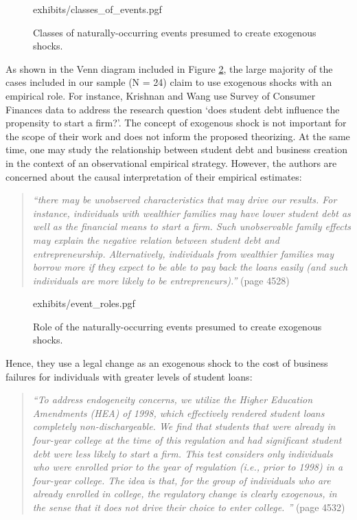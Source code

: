 \begin{refsection}
\begin{figure}[!htbp]
    \centering
    {exhibits/classes_of_events.pgf}
    \caption{Classes of naturally-occurring events presumed to create 
    exogenous shocks.}
    \label{fig:classes_of_events}
\end{figure}

As shown in the Venn diagram included in Figure \ref{fig:event_roles}, the large
majority of the cases included in our sample (N = 24) claim to use exogenous
shocks with an empirical role. For instance, Krishnan and Wang
\autocite*{krishnan20194522} use Survey of Consumer Finances data to address the
research question `does student debt influence the propensity to start a firm?'.
The concept of exogenous shock is not important for the scope of their work and
does not inform the proposed theorizing. At the same time, one may study the
relationship between student debt and business creation in the context of an
observational empirical strategy. However, the authors are concerned about the
causal interpretation of their empirical estimates:

\begin{quote}
  \textit{
  ``there may be unobserved characteristics that may drive our results. For
  instance, individuals with wealthier families may have lower student debt as
  well as the financial means to start a firm. Such unobservable family effects
  may explain the negative relation between student debt and entrepreneurship.
  Alternatively, individuals from wealthier families may borrow more if they
  expect to be able to pay back the loans easily (and such individuals are more
  likely to be entrepreneurs).''
  }
  (page 4528)
\end{quote}

\begin{figure}[!htbp]
    \centering
    {exhibits/event_roles.pgf}
    \caption{Role of the naturally-occurring events presumed to create exogenous shocks.}
    \label{fig:event_roles}
\end{figure}

Hence, they use a legal change as an exogenous shock to the cost of business 
failures for individuals with greater levels of student loans:

\begin{quote}
  \textit{
  ``To address endogeneity concerns, we utilize the Higher Education Amendments
  (HEA) of 1998, which effectively rendered student loans completely
  non-dischargeable. We find that students that were already in four-year college
  at the time of this regulation and had significant student debt were less
  likely to start a firm. This test considers only individuals who were enrolled
  prior to the year of regulation (i.e., prior to 1998) in a four-year college.
  The idea is that, for the group of individuals who are already enrolled in
  college, the regulatory change is clearly exogenous, in the sense that it
  does not drive their choice to enter college. ''
  }
  (page 4532)
\end{quote}


\end{refsection}
